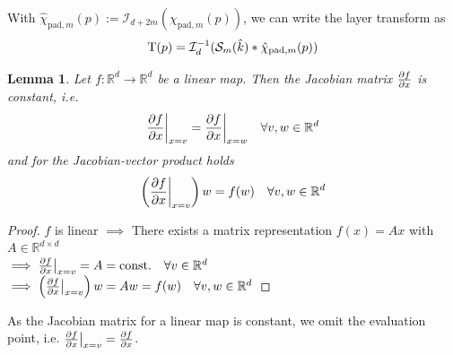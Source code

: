 \documentclass[twoside,a4paper]{article}
\newtheorem{lemma}{Lemma}
\begin{document}
With $\hat{\chi}_{\text{pad},m}(p) := \mathcal{I}_{d+2m}(\chi_{\text{pad},m}(p))$,
we can write the layer transform as
\begin{equation}\label{eq_conv_layer_transform}
	\mathrm{T}(p) =
	\mathcal{I}_{d}^{-1} (
		\mathcal{S}_{m}(\hat{k}) * \hat{\chi}_{\text{pad},m}(p)
	)
\end{equation}

\begin{lemma}\label{jac_linear_map}
	Let $f: \mathbb{R}^d \to \mathbb{R}^d$ be a linear map. Then the Jacobian matrix
	$\frac{\partial f}{\partial x}$ is constant, i.e.
	\begin{equation*}
		\frac{\partial f}{\partial x} \bigg|_{x = v} = \frac{\partial f}{\partial x} \bigg|_{x = w} \quad \forall v,w \in \mathbb{R}^d
	\end{equation*}
	and for the Jacobian-vector product holds
	\begin{equation*}
		\left( \frac{\partial f}{\partial x} \bigg|_{x = v} \right) w = f(w) \quad \forall v,w \in \mathbb{R}^d
	\end{equation*}
\end{lemma}
\begin{proof}
	$f$ is linear $\implies$ There exists a matrix representation $f(x) = Ax$ with
	$A \in \mathbb{R}^{d \times d}$ \\
	$\implies \frac{\partial f}{\partial x} \big|_{x=v} = A = \text{const.} \quad \forall v \in \mathbb{R}^d$
	$\implies \left( \frac{\partial f}{\partial x} \big|_{x=v} \right) w = Aw = f(w) \quad \forall v,w \in \mathbb{R}^d$
\end{proof}
As the Jacobian matrix for a linear map is constant, we omit the evaluation point, i.e.
$\frac{\partial f}{\partial x} \big|_{x=v} = \frac{\partial f}{\partial x}$.
\end{document}
